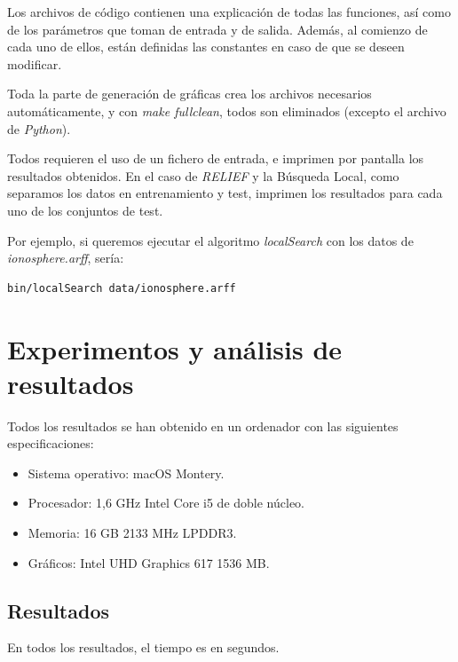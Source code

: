 \documentclass[11pt,a4paper]{article}
\begin{document}
Los archivos de código contienen una explicación de todas las funciones, así como de los parámetros que toman de entrada y de salida. Además, al comienzo de cada uno de ellos, están definidas las constantes en caso de que se deseen modificar.

Toda la parte de generación de gráficas crea los archivos necesarios automáticamente, y con \emph{make fullclean}, todos son eliminados (excepto el archivo de \emph{Python}).

Todos requieren el uso de un fichero de entrada, e imprimen por pantalla los resultados obtenidos. En el caso de \emph{RELIEF} y la Búsqueda Local, como separamos los datos en entrenamiento y test, imprimen los resultados para cada uno de los conjuntos de test.

Por ejemplo, si queremos ejecutar el algoritmo \emph{localSearch} con los datos de \emph{ionosphere.arff}, sería:
\begin{verbatim}
bin/localSearch data/ionosphere.arff
\end{verbatim}

\newpage
\section{Experimentos y análisis de resultados}
Todos los resultados se han obtenido en un ordenador con las siguientes especificaciones:
\begin{itemize}
\item Sistema operativo: macOS Montery.
\item Procesador: 1,6 GHz Intel Core i5 de doble núcleo.
\item Memoria: 16 GB 2133 MHz LPDDR3.
\item Gráficos: Intel UHD Graphics 617 1536 MB.
\end{itemize}

\subsection{Resultados}

En todos los resultados, el tiempo es en segundos.
\end{document}
